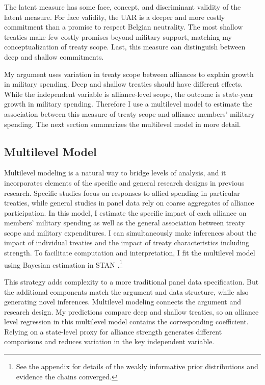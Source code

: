 \documentclass[12pt]{article}
\begin{document}
The latent measure has some face, concept, and discriminant validity of the latent measure. 
For face validity, the UAR is a deeper and more costly commitment than a promise to respect Belgian neutrality. 
The most shallow treaties make few costly promises beyond military support, matching my conceptualization of treaty scope. 
Last, this measure can distinguish between deep and shallow commitments. 


My argument uses variation in treaty scope between alliances to explain growth in military spending.
Deep and shallow treaties should have different effects. 
While the independent variable is alliance-level scope, the outcome is state-year growth in military spending. 
Therefore I use a multilevel model to estimate the association between this measure of treaty scope and alliance members' military spending.  
The next section summarizes the multilevel model in more detail. 


\subsection{Multilevel Model} 


Multilevel modeling is a natural way to bridge levels of analysis, and it incorporates elements of the specific and general research designs in previous research. 
Specific studies focus on responses to allied spending in particular treaties, while general studies in panel data rely on coarse aggregates of alliance participation.
In this model, I estimate the specific impact of each alliance on members' military spending as well as the general association between treaty scope and military expenditures. 
I can simultaneously make inferences about the impact of individual treaties and the impact of treaty characteristics including strength. 
To facilitate computation and interpretation, I fit the multilevel model using Bayesian estimation in STAN \citep{Carpenteretal2016}.\footnote{See the appendix for details of the weakly informative prior distributions and evidence the chains converged.}


This strategy adds complexity to a more traditional panel data specification. 
But the additional components match the argument and data structure, while also generating novel inferences. 
Multilevel modeling connects the argument and research design. 
My predictions compare deep and shallow treaties, so an alliance level regression in this multilevel model contains the corresponding coefficient.
Relying on a state-level proxy for alliance strength generates different comparisons and reduces variation in the key independent variable.
\end{document}
